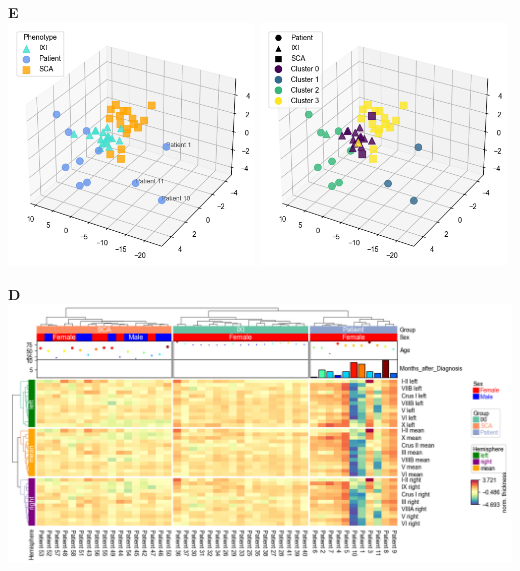 \documentclass{standalone}
\begin{document}
\begin{minipage}[t]{0.35\textwidth}
    \textbf{E}\\[4pt]
    \includegraphics[width=0.49\textwidth]{graphics/pca.png}
    \includegraphics[width=0.49\textwidth]{graphics/pca_clustered.png}
\end{minipage}
\begin{minipage}[t]{0.75\textwidth}
    \textbf{D}\\[4pt]
    \includegraphics[width=\textwidth]{graphics/heatmap.png}
\end{minipage}
\end{document}
